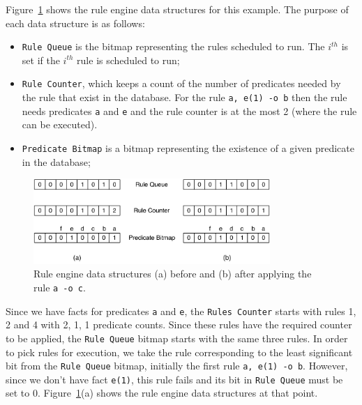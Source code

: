 Figure~\ref{fig:implementation:rule_engine} shows the rule engine data
structures for this example. The purpose of each data structure is as follows:

\begin{itemize}

   \item \texttt{Rule Queue} is the bitmap representing the rules scheduled to
      run. The $i^{th}$ is set if the $i^{th}$ rule is scheduled to run;

   \item \texttt{Rule Counter}, which keeps a count of the number of predicates
      needed by the rule that exist in the database. For the rule
      \texttt{a, e(1) -o b} then the rule needs predicates \texttt{a} and
      \texttt{e} and the rule counter is at the most 2 (where the rule can be
      executed).

   \item \texttt{Predicate Bitmap} is a bitmap representing the existence of a
      given predicate in the database;

\end{itemize}

\begin{figure}[t]
   \centering
   \includegraphics[width=0.8\textwidth]{figures/implementation/rule_queue.pdf}
   \caption{Rule engine data structures (a) before and (b) after applying 
      the rule \texttt{a -o c}.}
   \label{fig:implementation:rule_engine}
\end{figure}

Since we have facts for predicates \texttt{a} and \texttt{e}, the \texttt{Rules
Counter} starts with rules 1, 2 and 4 with 2, 1, 1 predicate counts. Since these
rules have the required counter to be applied, the \texttt{Rule Queue} bitmap
starts with the same three rules.  In order to pick rules for execution, we take
the rule corresponding to the least significant bit from the \texttt{Rule Queue}
bitmap, initially the first rule \texttt{a, e(1) -o b}. However, since we don't
have fact \texttt{e(1)}, this rule fails and its bit in \texttt{Rule Queue} must
be set to 0.  Figure~\ref{fig:implementation:rule_engine}(a) shows the rule
engine data structures at that point.

